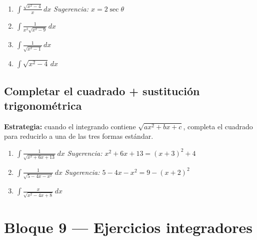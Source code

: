 \documentclass[12pt, letterpaper]{article}
\newcommand{\dx}{\,dx}
\begin{document}
\begin{enumerate}[label=\textbf{\arabic*.}, leftmargin=*, itemsep=12pt, start=94]

  \item \medio\quad
    $\displaystyle\int \frac{\sqrt{x^2-4}}{x}\dx$
    \qquad\textit{Sugerencia: $x = 2\sec\theta$}

  \item \medio\quad
    $\displaystyle\int \frac{1}{x^2\sqrt{x^2-9}}\dx$

  \item \dificil\quad
    $\displaystyle\int \frac{1}{\sqrt{x^2-1}}\dx$

  \item \dificil\quad
    $\displaystyle\int \sqrt{x^2-4}\dx$

\end{enumerate}

\subsection{Completar el cuadrado + sustitución trigonométrica}

\begin{cuadroadvertencia}
\small\textbf{Estrategia:} cuando el integrando contiene $\sqrt{ax^2+bx+c}$,
completa el cuadrado para reducirlo a una de las tres formas estándar.
\end{cuadroadvertencia}

\begin{enumerate}[label=\textbf{\arabic*.}, leftmargin=*, itemsep=14pt, start=98]

  \item \medio\quad
    $\displaystyle\int \frac{1}{\sqrt{x^2+6x+13}}\dx$
    \qquad\textit{Sugerencia: $x^2+6x+13 = (x+3)^2+4$}

  \item \dificil\quad
    $\displaystyle\int \frac{1}{\sqrt{5-4x-x^2}}\dx$
    \qquad\textit{Sugerencia: $5-4x-x^2 = 9-(x+2)^2$}

  \item \dificil\quad
    $\displaystyle\int \frac{x}{\sqrt{x^2-4x+8}}\dx$

\end{enumerate}

\vspace{4pt}

\section{Bloque 9 — Ejercicios integradores}
\end{document}

